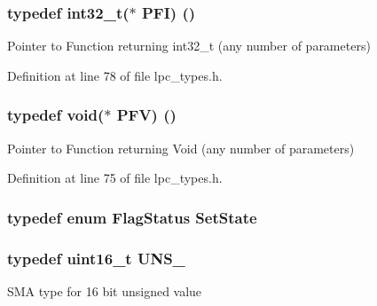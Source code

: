 \subsubsection[{\texorpdfstring{P\+FI}{PFI}}]{\setlength{\rightskip}{0pt plus 5cm}typedef {\bf int32\+\_\+t}($\ast$ P\+FI) ()}\hypertarget{group___l_p_c___types___public___types_ga5cad251913e41ad7a8c765945356ec47}{}\label{group___l_p_c___types___public___types_ga5cad251913e41ad7a8c765945356ec47}
Pointer to Function returning int32\+\_\+t (any number of parameters) 

Definition at line 78 of file lpc\+\_\+types.\+h.

\subsubsection[{\texorpdfstring{P\+FV}{PFV}}]{\setlength{\rightskip}{0pt plus 5cm}typedef {\bf void}($\ast$ P\+FV) ()}\hypertarget{group___l_p_c___types___public___types_ga5f7b826e88ffb1fae2260abb3a75b19a}{}\label{group___l_p_c___types___public___types_ga5f7b826e88ffb1fae2260abb3a75b19a}
Pointer to Function returning Void (any number of parameters) 

Definition at line 75 of file lpc\+\_\+types.\+h.

\subsubsection[{\texorpdfstring{Set\+State}{SetState}}]{\setlength{\rightskip}{0pt plus 5cm}typedef  enum {\bf Flag\+Status}  {\bf Set\+State}}\hypertarget{group___l_p_c___types___public___types_ga7fab312a9f10f1386a955977d2ec96fe}{}\label{group___l_p_c___types___public___types_ga7fab312a9f10f1386a955977d2ec96fe}
\subsubsection[{\texorpdfstring{U\+N\+S\+\_\+16}{UNS_16}}]{\setlength{\rightskip}{0pt plus 5cm}typedef {\bf uint16\+\_\+t} {\bf U\+N\+S\+\_}}\hypertarget{group___l_p_c___types___public___types_gafce87a7f2271b2cf38d7532f157f8a50}{}\label{group___l_p_c___types___public___types_gafce87a7f2271b2cf38d7532f157f8a50}
S\+MA type for 16 bit unsigned value 

